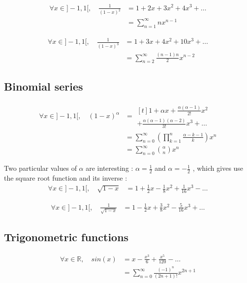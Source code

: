 \documentclass[hidelinks]{article}
\newenvironment{nalign}{
    \begin{equation}
    \begin{aligned}
}{
    \end{aligned}
    \end{equation}
    \ignorespacesafterend
}
\begin{document}
    \begin{nalign}
    \forall x \in ]-1,1[, \quad \frac{1}{(1-x)^2} &= 1 +2 x + 3x^2 + 4x^3 + \dots \\
    &=\sum_{n=1}^{\infty}nx^{n-1}
    \end{nalign}
    
    \begin{nalign}
    \forall x \in ]-1,1[, \quad \frac{1}{(1-x)^3} &= 1 +3 x + 4x^2 + 10x^3 + \dots \\
    &=\sum_{n=2}^{\infty}\frac{(n-1)n}{2}x^{n-2}
    \end{nalign}
    
    \subsection{Binomial series}
    
    \begin{nalign}
    \forall x \in ]-1,1[, \quad (1-x)^\alpha &= \begin{multlined}[t]1 +\alpha x + \frac{\alpha(\alpha - 1)}{2!} x^2 \\ + \frac{\alpha(\alpha - 1)(\alpha - 2)}{3!}x^3 + \dots \end{multlined}\\
    &=\sum_{n=0}^{\infty}\left( \prod_{k=1}^{n}\frac{\alpha-k-1}{k} \right)x^n
    \\ & = \sum_{n=0}^{\infty} \binom{\alpha}{n}x^n
    \end{nalign}
    
    Two particular values of $\alpha$ are interesting : $\alpha=\frac{1}{2}$ and $\alpha=-\frac{1}{2}$ , which gives use the square root function and its inverse : 
    \begin{nalign}
    \forall x \in ]-1,1[, \quad \sqrt{1-x} &= 1 + \frac{1}{2}x - \frac{1}{8}x^2 + \frac{1}{16}x^3- \dots
    \end{nalign}
    
    \begin{nalign}
    \forall x \in ]-1,1[, \quad \frac{1}{\sqrt{1-x}} &= 1 - \frac{1}{2}x + \frac{3}{8}x^2 - \frac{5}{16}x^3+ \dots
    \end{nalign}
    
    \subsection{Trigonometric functions}
    
    \begin{nalign}
    \forall x \in \mathbb{R}, \quad sin(x) &= x - \frac{x^3}{6} + \frac{x^5}{120} - \dots \\
    &= \sum_{n=0}^{\infty}\frac{(-1)^n}{(2n+1)!}x^{2n+1}
    \end{nalign}
    
\end{document}
